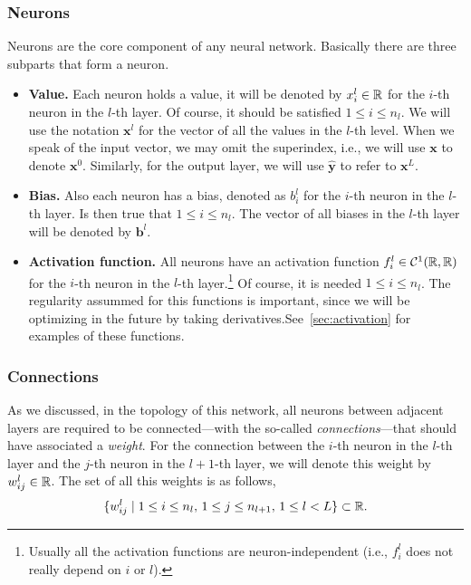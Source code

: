 \subsubsection{Neurons}

Neurons are the core component of any neural network. Basically there are three
subparts that form a neuron.
\begin{itemize}
  \item \textbf{Value.} Each neuron holds a value, it will be denoted by
  \(x_i^l \in \mathbb{R}\) for the \(i\)-th neuron in the \(l\)-th layer. Of course, it
  should be satisfied \(1 \leq i \leq n_l\). We will use the notation
  \(\mathbf{x}^l\) for the vector of all the values in the \(l\)-th level. When
  we speak of the input vector, we may omit the superindex, i.e., we will use
  \(\mathbf{x}\) to denote \(\mathbf{x}^0\). Similarly, for the output layer,
  we will use \(\mathbf{\hat{y}}\) to refer to \(\mathbf{x}^L\).
  \item \textbf{Bias.} Also each neuron has a bias, denoted as \(b_i^l\) for
  the \(i\)-th neuron in the \(l\)-th layer. Is then true that
  \(1 \leq i \leq n_l\). The vector of all biases in the \(l\)-th layer will be
  denoted by \(\mathbf{b}^l\).
  \item \textbf{Activation function.} All neurons have an activation function
  \(f_i ^ l \in \mathcal{C} ^ 1 (\mathbb{R}, \mathbb{R})\) for the \(i\)-th neuron in the
  \(l\)-th layer.\footnote{Usually all the activation functions are
    neuron-independent (i.e., \(f_i^l\) does not really depend on \(i\) or
    \(l\)).} Of course, it is needed \(1 \leq i \leq n_l\). The regularity
  assummed for this functions is important, since we will be optimizing in the
  future by taking derivatives.See\ \vref{sec:activation} for examples of these
  functions.
\end{itemize}

\subsubsection{Connections}

As we discussed, in the topology of this network, all neurons between adjacent
layers are required to be connected---with the so-called
\emph{connections}---that should have associated a \emph{weight}. For the
connection between the \(i\)-th neuron in the \(l\)-th layer and the \(j\)-th
neuron in the \(l + 1\)-th layer, we will denote this weight by
\(w_{ij}^l \in \mathbb{R}\). The set of all this weights is as follows,
\begin{equation}
  \{w_{ij}^l \mid 1 \leq i \leq n_{l}, \, 1 \leq j \leq n_{l+1}, \,
  1 \leq l < L \} \subset \mathbb{R}.
\end{equation}

